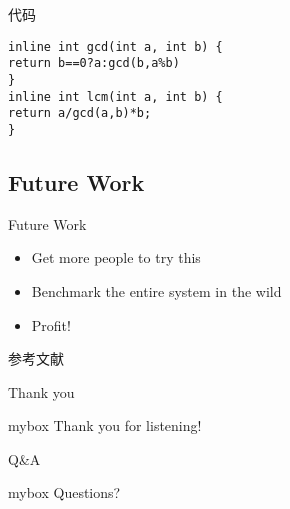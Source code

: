 \documentclass[UTF8,10pt,aspectratio=43]{ctexbeamer}
\begin{document}
\begin{frame}[fragile]{代码}
\begin{lstlisting}
inline int gcd(int a, int b) { 
return b==0?a:gcd(b,a%b)
}
inline int lcm(int a, int b) {
return a/gcd(a,b)*b;
}
\end{lstlisting}
\end{frame}


\subsection{Future Work}
\begin{frame}{Future Work}  %
\begin{itemize}
\item Get more people to try this
\item Benchmark the entire system in the wild
\item Profit!
\end{itemize}
\end{frame}

\begin{frame}{参考文献}


\end{frame}

\begin{frame}{Thank you}
\begin{center}
\begin{minipage}{1\textwidth}
 \begin{beamercolorbox}[wd=0.70\textwidth, rounded=true, shadow=true]{mybox}
\LARGE \centering Thank you for listening!  %
\end{beamercolorbox}
 \end{minipage}
\end{center}
\end{frame}

\begin{frame}{Q\&A}
\begin{center}
	\begin{minipage}{1\textwidth}
		\begin{beamercolorbox}[wd=0.70\textwidth, rounded=true, shadow=true]{mybox}
			\LARGE \centering  Questions?  %
		\end{beamercolorbox}
	\end{minipage}
\end{center}
\end{frame}

\end{document}
